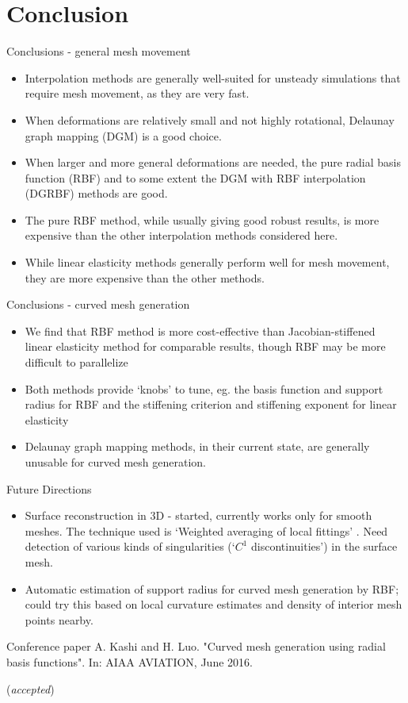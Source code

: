 \documentclass[t,12pt]{beamer}
\begin{document}
\section{Conclusion}
\begin{frame}[allowframebreaks]{Conclusions - general mesh movement}
\begin{itemize}
\item Interpolation methods are generally well-suited for unsteady simulations that require mesh movement, as they are very fast.
\item When deformations are relatively small and not highly rotational, Delaunay graph mapping (DGM) is a good choice.
\item When larger and more general deformations are needed, the pure radial basis function (RBF) and to some extent the DGM with RBF interpolation (DGRBF) methods are good. 
\item The pure RBF method, while usually giving good robust results, is more expensive than the other interpolation methods considered here.
\item While linear elasticity methods generally perform well for mesh movement, they are more expensive than the other methods.
\end{itemize}
\end{frame}
\begin{frame}{Conclusions - curved mesh generation}
\begin{itemize}
	\item We find that RBF method is more cost-effective than Jacobian-stiffened linear elasticity method for comparable results, though RBF may be more difficult to parallelize
	\item Both methods provide `knobs' to tune, eg. the basis function and support radius for RBF and the stiffening criterion and stiffening exponent for linear elasticity
	\item Delaunay graph mapping methods, in their current state, are generally unusable for curved mesh generation.
\end{itemize}
\end{frame}
\begin{frame}{Future Directions}
\begin{itemize}
	\item Surface reconstruction in 3D - started, currently works only for smooth meshes. The technique used is `Weighted averaging of local fittings' . 
	Need detection of various kinds of singularities (`$C^1$ discontinuities') in the surface mesh.
	\item Automatic estimation of support radius for curved mesh generation by RBF; could try this based on local curvature estimates and density of interior mesh points nearby.
\end{itemize}
\end{frame}

\begin{frame}{Conference paper}
	A. Kashi and H. Luo. "Curved mesh generation using radial basis functions". In: AIAA AVIATION, June 2016. 
	
	(\emph{accepted})
\end{frame}

\printbibliography
\end{document}
